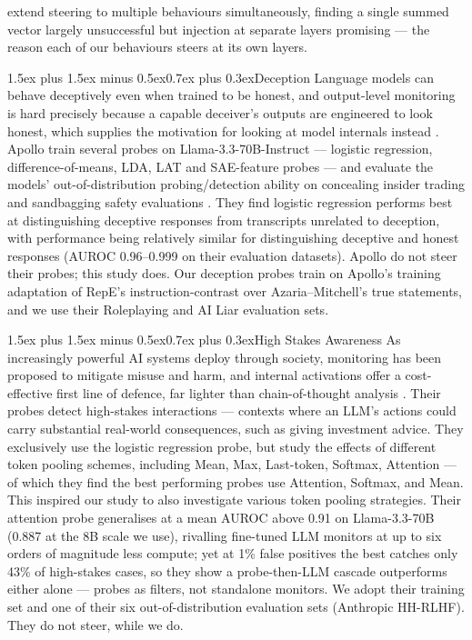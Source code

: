 \documentclass[conference]{IEEEtran}
\makeatletter
\renewcommand{\paragraph}{\@startsection{paragraph}{4}{2em}%
  {1.5ex plus 1.5ex minus 0.5ex}{0.7ex plus 0.3ex}{\normalfont\normalsize\itshape}}
\makeatother
\begin{document}
\citet{vanderweij2024} extend steering
to multiple behaviours simultaneously, finding a single summed vector largely
unsuccessful but injection at separate layers promising --- the reason each of
our behaviours steers at its own layers.

\paragraph{Deception}
Language models can behave deceptively even when trained to be honest, and
output-level monitoring is hard precisely because a capable deceiver's outputs
are engineered to look honest, which supplies the motivation for looking at
model internals instead \citep{goldowsky2025}. Apollo train several probes on
Llama-3.3-70B-Instruct --- logistic regression, difference-of-means, LDA, LAT
and SAE-feature probes --- and evaluate the models' out-of-distribution
probing/detection ability on concealing insider trading \citep{scheurer2023} and
sandbagging safety evaluations \citep{benton2024}. They find logistic
regression performs best at distinguishing deceptive responses from transcripts
unrelated to deception, with performance being relatively similar for
distinguishing deceptive and honest responses (AUROC 0.96--0.999 on their
evaluation datasets). Apollo do not steer their probes; this study does. Our
deception probes train on Apollo's training adaptation of RepE's
instruction-contrast over Azaria--Mitchell's true statements, and we use their
Roleplaying and AI Liar \citep{pacchiardi2024} evaluation sets.

\paragraph{High Stakes Awareness}
As increasingly powerful AI systems deploy through society, monitoring has been
proposed to mitigate misuse and harm, and internal activations offer a
cost-effective first line of defence, far lighter than chain-of-thought
analysis \citep{mckenzie2025}. Their probes detect high-stakes interactions ---
contexts where an LLM's actions could carry substantial real-world
consequences, such as giving investment advice. They exclusively use the
logistic regression probe, but study the effects of different token pooling
schemes, including Mean, Max, Last-token, Softmax, Attention --- of which they
find the best performing probes use Attention, Softmax, and Mean. This inspired
our study to also investigate various token pooling strategies. Their attention
probe generalises at a mean AUROC above 0.91 on Llama-3.3-70B (0.887 at the 8B
scale we use), rivalling fine-tuned LLM monitors at up to six orders of
magnitude less compute; yet at 1\% false positives the best catches only 43\%
of high-stakes cases, so they show a probe-then-LLM cascade outperforms either
alone --- probes as filters, not standalone monitors. We adopt their training
set and one of their six out-of-distribution evaluation sets (Anthropic
HH-RLHF). They do not steer, while we do.
\end{document}

